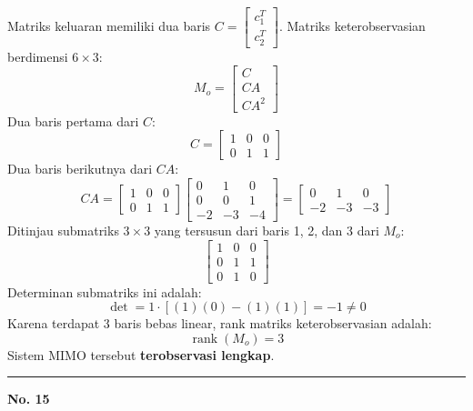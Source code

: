 \documentclass[11pt,a4paper]{article}
\begin{document}
Matriks keluaran memiliki dua baris $C = \begin{bmatrix} c_1^T \\ c_2^T \end{bmatrix}$. Matriks keterobservasian berdimensi $6 \times 3$:
$$M_o = \begin{bmatrix} C \\ CA \\ CA^2 \end{bmatrix}$$
Dua baris pertama dari $C$:
$$C = \begin{bmatrix} 1 & 0 & 0 \\ 0 & 1 & 1 \end{bmatrix}$$
Dua baris berikutnya dari $CA$:
$$CA = \begin{bmatrix} 1 & 0 & 0 \\ 0 & 1 & 1 \end{bmatrix} \begin{bmatrix} 0 & 1 & 0 \\ 0 & 0 & 1 \\ -2 & -3 & -4 \end{bmatrix} = \begin{bmatrix} 0 & 1 & 0 \\ -2 & -3 & -3 \end{bmatrix}$$
Ditinjau submatriks $3 \times 3$ yang tersusun dari baris 1, 2, dan 3 dari $M_o$:
$$\begin{bmatrix} 1 & 0 & 0 \\ 0 & 1 & 1 \\ 0 & 1 & 0 \end{bmatrix}$$
Determinan submatriks ini adalah:
$$\det = 1 \cdot [(1)(0) - (1)(1)] = -1 \ne 0$$
Karena terdapat 3 baris bebas linear, rank matriks keterobservasian adalah:
$$\operatorname{rank}(M_o) = 3$$
Sistem MIMO tersebut \textbf{terobservasi lengkap}.

\vspace{12pt}
\hrule
\vspace{10pt}

\textbf{\large No. 15}
\end{document}
